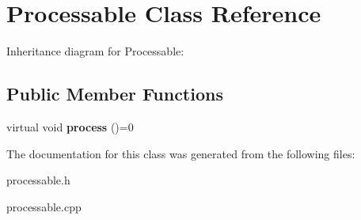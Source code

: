 \hypertarget{classProcessable}{}\section{Processable Class Reference}
\label{classProcessable}


Inheritance diagram for Processable\+:
\subsection*{Public Member Functions}
\begin{DoxyCompactItemize}
\item 
\mbox{\label{classProcessable_a56c36f88f509d6030d06d58f6bf9d8df}} 
virtual void {\bfseries process} ()=0
\end{DoxyCompactItemize}


The documentation for this class was generated from the following files\+:\begin{DoxyCompactItemize}
\item 
processable.\+h\item 
processable.\+cpp\end{DoxyCompactItemize}
